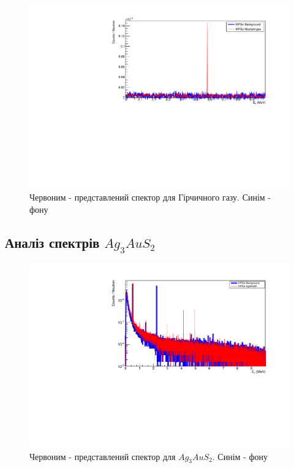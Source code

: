 \documentclass[a4paper, 14pt]{article}
\numberwithin{equation}{section}
\numberwithin{table}{section}
\begin{document}
	\begin{figure}[hbt!]
		\centering \includegraphics[width=1\textwidth]{res/mustFon89.pdf}
		\caption{Червоним - представлений спектор для Гірчичного газу. Синім - фону} 
		\label{ris:MustFon89}	
	\end{figure} 
	
\newpage
\subsection{Аналіз спектрів $Ag_3AuS_2$}

	\begin{figure}[h!]
		\centering \includegraphics[width=1\textwidth]{res/auFonAllLog.pdf}
		\caption{Червоним - представлений спектор для $Ag_3AuS_2$. Синім - фону} 
		\label{ris:Ag3AuS2Fon}	
	\end{figure} 	
\end{document}
